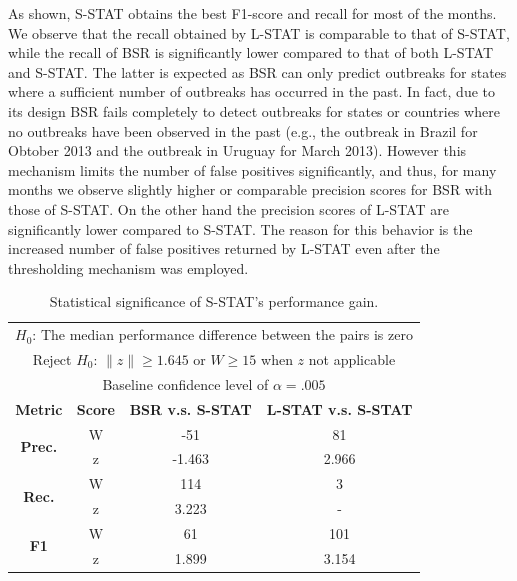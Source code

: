 \documentclass[conference]{IEEEtran}
\newcommand{\fullmodel}{{S-STAT}\xspace}
\newcommand{\locationmodel}{{L-STAT}\xspace}
\begin{document}
As shown, \fullmodel  obtains the best F1-score and recall for most of the months. We observe that the recall obtained by \locationmodel is comparable to that of \fullmodel, while the recall of BSR is significantly lower compared to that of both \locationmodel and \fullmodel. The latter is expected as BSR can only predict outbreaks for states where a sufficient number of outbreaks has occurred in the past. In fact, due to its design BSR fails completely to detect outbreaks for states or countries where no outbreaks have been observed in the past (e.g., the outbreak in Brazil for Obtober 2013 and the outbreak in Uruguay for March 2013).  However this mechanism limits the number of false positives significantly, and thus, for many months we observe slightly higher or comparable precision scores for BSR with those of \fullmodel. On the other hand the precision scores of \locationmodel are significantly lower compared to \fullmodel. The reason for this behavior is the increased number of false positives returned by \locationmodel even after the thresholding mechanism was employed. 

\begin{table}[h]
 \centering
\caption{Statistical significance of \fullmodel's performance gain.}
\begin{tabular}{|c|c|c|c|} 
\multicolumn{4}{c}{$H_0$: The median performance difference between the pairs is zero} \\
\multicolumn{4}{c}{Reject $H_0$: $\|z\| \geq 1.645$ or $W \geq 15$ when $z$ not applicable} \\ 
\multicolumn{4}{c}{Baseline confidence level of $\alpha =.005$} \\ \hline
{\bf Metric} & {\bf Score} & {\bf BSR v.s. \fullmodel} & {\bf \locationmodel v.s. \fullmodel} \\ \hline
\multirow{2}{*}{{\bf Prec.}} & W & -51 & 81\\
& z & -1.463 & 2.966 \\ \hline
\multirow{2}{*}{{\bf Rec.}} & W & 114 & 3\\
& z & 3.223 & -\\ \hline
\multirow{2}{*}{{\bf F1}} & W & 61 & 101\\
& z & 1.899 & 3.154\\ \hline
\end{tabular}
\label{tab:significance}
\end{table}
\end{document}
